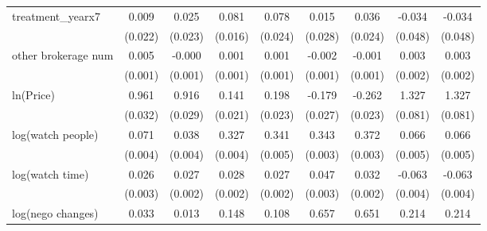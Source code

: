 {\begin{adjustbox}{max width=\textwidth}
\begin{tabular}{l*{8}{c}}
\addlinespace
treatment\_yearx7&       0.009         &       0.025         &       0.081\sym{***}&       0.078\sym{***}&       0.015         &       0.036         &      -0.034         &      -0.034         \\
            &     (0.022)         &     (0.023)         &     (0.016)         &     (0.024)         &     (0.028)         &     (0.024)         &     (0.048)         &     (0.048)         \\
\addlinespace
other brokerage num  &       0.005\sym{***}&      -0.000         &       0.001         &       0.001         &      -0.002         &      -0.001         &       0.003         &       0.003         \\
            &     (0.001)         &     (0.001)         &     (0.001)         &     (0.001)         &     (0.001)         &     (0.001)         &     (0.002)         &     (0.002)         \\
\addlinespace
ln(Price)&       0.961\sym{***}&       0.916\sym{***}&       0.141\sym{***}&       0.198\sym{***}&      -0.179\sym{***}&      -0.262\sym{***}&       1.327\sym{***}&       1.327\sym{***}\\
            &     (0.032)         &     (0.029)         &     (0.021)         &     (0.023)         &     (0.027)         &     (0.023)         &     (0.081)         &     (0.081)         \\
\addlinespace
log(watch people)&       0.071\sym{***}&       0.038\sym{***}&       0.327\sym{***}&       0.341\sym{***}&       0.343\sym{***}&       0.372\sym{***}&       0.066\sym{***}&       0.066\sym{***}\\
            &     (0.004)         &     (0.004)         &     (0.004)         &     (0.005)         &     (0.003)         &     (0.003)         &     (0.005)         &     (0.005)         \\
\addlinespace
log(watch time)&       0.026\sym{***}&       0.027\sym{***}&       0.028\sym{***}&       0.027\sym{***}&       0.047\sym{***}&       0.032\sym{***}&      -0.063\sym{***}&      -0.063\sym{***}\\
            &     (0.003)         &     (0.002)         &     (0.002)         &     (0.002)         &     (0.003)         &     (0.002)         &     (0.004)         &     (0.004)         \\
\addlinespace
log(nego changes)&       0.033\sym{***}&       0.013\sym{**} &       0.148\sym{***}&       0.108\sym{***}&       0.657\sym{***}&       0.651\sym{***}&       0.214\sym{***}&       0.214\sym{***}\\

\end{tabular}
\end{adjustbox}}
